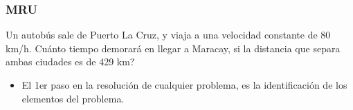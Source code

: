 \documentclass{beamer}
\begin{document}
\begin{frame}
\frametitle{MRU}
% 
 
Un {{ autob\'us }} sale de Puerto La Cruz, y viaja a una
velocidad constante de 80 km/h. Cu\'anto tiempo
demorar\'a en llegar a Maracay, si la distancia que separa
ambas ciudades es de 429 km?

 
\begin{itemize}                                                              

\item El 1er paso en la resoluci\'on de cualquier problema, es la
identificaci\'on de los elementos del problema.            
              
\end{itemize}                                                 
 
 
\scalebox{1} %
{
}

\end{frame}
\end{document}

